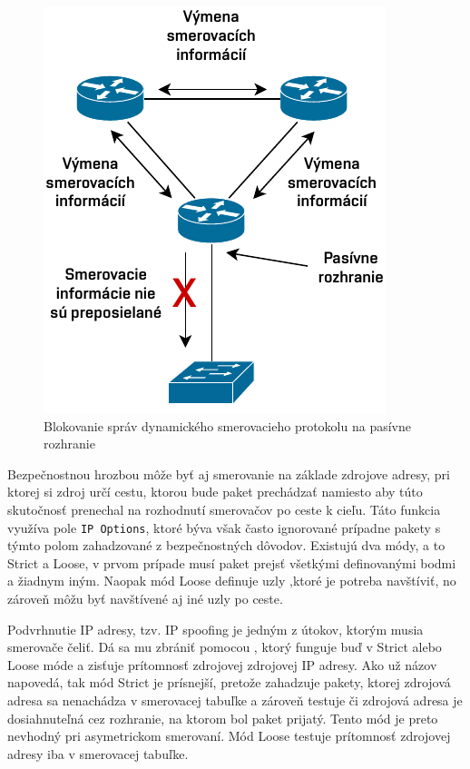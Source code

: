 \begin{figure}[H]
	\begin{center}
		\includegraphics[scale=1]{obrazky/passive-interface.pdf}
	\end{center}
	\caption[Blokovanie správ dynamického smerovacieho protokolu na pasívne rozhranie]{Blokovanie správ dynamického smerovacieho protokolu na pasívne rozhranie}
	\label{fig:passive-int}
\end{figure} 

Bezpečnostnou hrozbou môže byť aj smerovanie na základe zdrojove adresy, pri ktorej si zdroj určí cestu, ktorou bude paket prechádzať namiesto aby túto skutočnosť prenechal na rozhodnutí smerovačov po ceste k cieľu. Táto funkcia využíva pole \texttt{IP Options}, ktoré býva však často ignorované prípadne pakety s týmto polom zahadzované z bezpečnostných dôvodov. Existujú dva módy, a to Strict a Loose, v prvom prípade musí paket prejsť všetkými definovanými bodmi a žiadnym iným. Naopak mód Loose definuje uzly ,ktoré je potreba navštíviť, no zároveň môžu byť navštívené aj iné uzly po ceste.  

Podvrhnutie IP adresy, tzv. IP spoofing je jedným z útokov, ktorým musia smerovače čeliť. Dá sa mu zbrániť pomocou , ktorý funguje buď v Strict alebo Loose móde a zisťuje prítomnosť zdrojovej zdrojovej IP adresy. Ako už názov napovedá, tak mód Strict je prísnejší, pretože zahadzuje pakety, ktorej zdrojová adresa sa nenachádza v smerovacej tabuľke a zároveň testuje či zdrojová adresa je dosiahnuteľná cez rozhranie, na ktorom bol paket prijatý. Tento mód je preto nevhodný pri asymetrickom smerovaní. Mód Loose testuje prítomnosť zdrojovej adresy iba v smerovacej tabuľke. 

